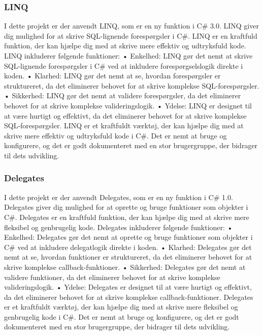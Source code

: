 \subsubsection{LINQ}
I dette projekt er der anvendt LINQ, som er en ny funktion i C\# 3.0. LINQ giver dig mulighed for at skrive SQL-lignende forespørgsler i C#. LINQ er en kraftfuld funktion, der kan hjælpe dig med at skrive mere effektiv og udtryksfuld kode.
LINQ inkluderer følgende funktioner:
•	Enkelhed: LINQ gør det nemt at skrive SQL-lignende forespørgsler i C# ved at inkludere forespørgselslogik direkte i koden.
•	Klarhed: LINQ gør det nemt at se, hvordan forespørgsler er struktureret, da det eliminerer behovet for at skrive komplekse SQL-forespørgsler.
•	Sikkerhed: LINQ gør det nemt at validere forespørgsler, da det eliminerer behovet for at skrive komplekse valideringslogik.
•	Ydelse: LINQ er designet til at være hurtigt og effektivt, da det eliminerer behovet for at skrive komplekse SQL-forespørgsler.
LINQ er et kraftfuldt værktøj, der kan hjælpe dig med at skrive mere effektiv og udtryksfuld kode i C#. Det er nemt at bruge og konfigurere, og det er godt dokumenteret med en stor brugergruppe, der bidrager til dets udvikling.

\subsubsection{Delegates}
I dette projekt er der anvendt Delegates, som er en ny funktion i C\# 1.0. Delegates giver dig mulighed for at oprette og bruge funktioner som objekter i C#. Delegates er en kraftfuld funktion, der kan hjælpe dig med at skrive mere fleksibel og genbrugelig kode.
Delegates inkluderer følgende funktioner:
•	Enkelhed: Delegates gør det nemt at oprette og bruge funktioner som objekter i C# ved at inkludere delegatlogik direkte i koden.
•	Klarhed: Delegates gør det nemt at se, hvordan funktioner er struktureret, da det eliminerer behovet for at skrive komplekse callback-funktioner.
•	Sikkerhed: Delegates gør det nemt at validere funktioner, da det eliminerer behovet for at skrive komplekse valideringslogik.
•	Ydelse: Delegates er designet til at være hurtigt og effektivt, da det eliminerer behovet for at skrive komplekse callback-funktioner.
Delegates er et kraftfuldt værktøj, der kan hjælpe dig med at skrive mere fleksibel og genbrugelig kode i C#. Det er nemt at bruge og konfigurere, og det er godt dokumenteret med en stor brugergruppe, der bidrager til dets udvikling.

